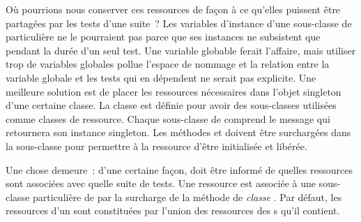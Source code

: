\documentclass[a4paper,10pt,twoside]{book}
\begin{document}
Où pourrions nous conserver ces ressources de façon à ce qu'elles puissent être partagées par 
les tests d'une suite~?
Les variables d'instance d'une sous-classe de  particulière ne le pourraient pas 
parce que ses instances ne subsistent que pendant la durée d'un seul test.
Une variable globable ferait l'affaire, mais utiliser trop de variables globales pollue 
l'espace de nommage et la relation entre la variable globale et les tests qui en dépendent 
ne serait pas explicite.
Une meilleure solution est de placer les ressources nécessaires dans l'objet singleton d'une 
certaine classe. La classe  est définie pour avoir des sous-classes 
utilisées comme classes de ressource. Chaque sous-classe de  comprend 
le message  qui retournera son instance singleton.
Les méthodes   et  doivent être surchargées dans la sous-classe pour permettre 
à la ressource d'être initialisée et libérée.

Une chose demeure~: d'une certaine façon, \sunit doit être informé de quelles ressources sont 
associées avec quelle suite de tests. Une ressource est associée à une sous-classe particulière 
de  par la surcharge de la méthode de \emph{classe} .
Par défaut, les ressources d'un  sont constituées par l'union des ressources 
des s qu'il contient.

\end{document}
